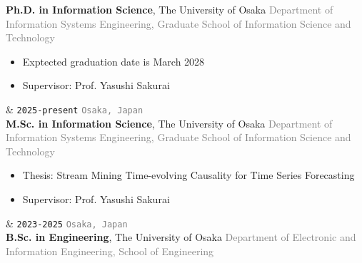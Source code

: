 \documentclass[9pt,a4paper]{article}
\newcommand{\OU}{The University of Osaka}
\newcommand{\Prof}[1]{Prof.\! #1}
\newcommand{\YSakurai}{Yasushi Sakurai}
\newcommand{\Duration}[2]{\fontsize{10pt}{0}\selectfont \texttt{#1-#2}}
\newcommand{\Ongoing}{present}
\begin{document}
\begin{EntriesTableRight}
  \textbf{Ph.D. in Information Science}, \OU
  \vspace{-0.1em}
  \newline
  \textcolor{gray}{{\fontsize{9pt}{0}\selectfont Department of Information Systems Engineering, Graduate School of Information Science and Technology}}
  \vspace{-0.1em}
  \newline
  {\setlength{\leftmargini}{17.2pt}
  \begin{itemize}
  \vspace{-1.0em}
      \item Exptected graduation date is March 2028
      \item Supervisor: \Prof{\YSakurai}
  \vspace{-1.3em}
  \end{itemize}}
  &
  \hfill
  \Duration{2025}{\Ongoing}
  \vspace{0.30em}
  \newline
  \hfill
  \textcolor{gray}{\fontsize{9pt}{0}\selectfont \texttt{Osaka, \!\!Japan}~}
  \\[4.45em]
  \textbf{M.Sc.\! in Information Science}, \OU
  \vspace{-0.1em}
  \newline
  \textcolor{gray}{{\fontsize{9pt}{0}\selectfont Department of Information Systems Engineering, Graduate School of Information Science and Technology}}
  \vspace{-0.1em}
  \newline
  {\setlength{\leftmargini}{17.2pt}
  \begin{itemize}
  \vspace{-1.0em}
      \item Thesis: Stream Mining Time-evolving Causality for Time Series Forecasting
      \item Supervisor: \Prof{\YSakurai}
  \vspace{-1.3em}
  \end{itemize}}
  &
  \hfill
  \Duration{2023}{2025}
  \vspace{0.5em}
  \newline
  \hfill
  \textcolor{gray}{\fontsize{9pt}{0}\selectfont \texttt{Osaka, \!\!Japan}~}
  \\[4.45em]
  \textbf{B.Sc.\! in Engineering}, \OU
  \vspace{-0.1em}
  \newline
  \textcolor{gray}{{\fontsize{9pt}{0}\selectfont Department of Electronic and Information Engineering, School of Engineering}}

\end{EntriesTableRight}
\end{document}
